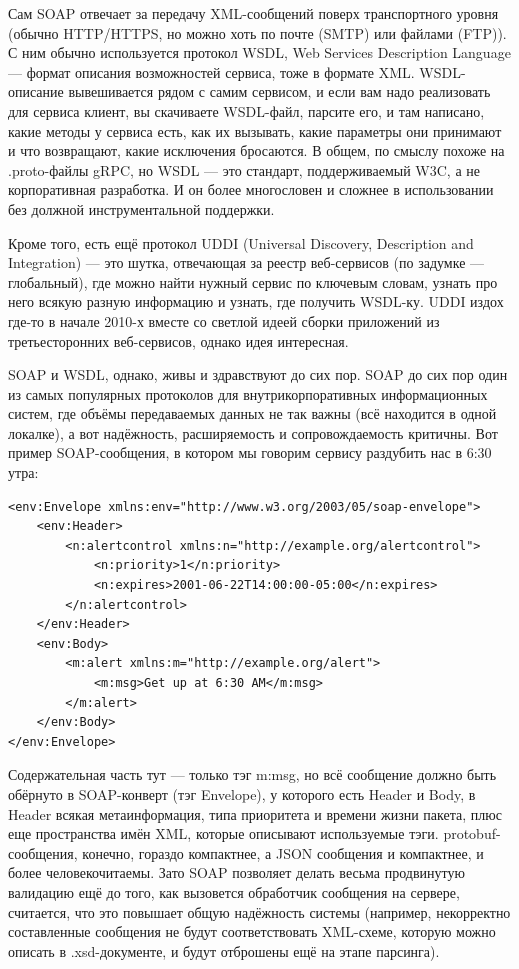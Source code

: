 \documentclass[a5paper]{article}
\begin{document}
Сам SOAP отвечает за передачу XML-сообщений поверх транспортного уровня (обычно HTTP/HTTPS, но можно хоть по почте (SMTP) или файлами (FTP)). С ним обычно используется протокол WSDL, Web Services Description Language --- формат описания возможностей сервиса, тоже в формате XML. WSDL-описание вывешивается рядом с самим сервисом, и если вам надо реализовать для сервиса клиент, вы скачиваете WSDL-файл, парсите его, и там написано, какие методы у сервиса есть, как их вызывать, какие параметры они принимают и что возвращают, какие исключения бросаются. В общем, по смыслу похоже на .proto-файлы gRPC, но WSDL --- это стандарт, поддерживаемый W3C, а не корпоративная разработка. И он более многословен и сложнее в использовании без должной инструментальной поддержки.

Кроме того, есть ещё протокол UDDI (Universal Discovery, Description and Integration) --- это шутка, отвечающая за реестр веб-сервисов (по задумке --- глобальный), где можно найти нужный сервис по ключевым словам, узнать про него всякую разную информацию и узнать, где получить WSDL-ку. UDDI издох где-то в начале 2010-х вместе со светлой идеей сборки приложений из третьесторонних веб-сервисов, однако идея интересная.

SOAP и WSDL, однако, живы и здравствуют до сих пор. SOAP до сих пор один из самых популярных протоколов для внутрикорпоративных информационных систем, где объёмы передаваемых данных не так важны (всё находится в одной локалке), а вот надёжность, расширяемость и сопровождаемость критичны. Вот пример SOAP-сообщения, в котором мы говорим сервису раздубить нас в 6:30 утра:

\begin{verbatim}
<env:Envelope xmlns:env="http://www.w3.org/2003/05/soap-envelope">
    <env:Header>
        <n:alertcontrol xmlns:n="http://example.org/alertcontrol">
            <n:priority>1</n:priority>
            <n:expires>2001-06-22T14:00:00-05:00</n:expires>
        </n:alertcontrol>
    </env:Header>
    <env:Body>
        <m:alert xmlns:m="http://example.org/alert">
            <m:msg>Get up at 6:30 AM</m:msg>
        </m:alert>
    </env:Body>
</env:Envelope>
\end{verbatim}

Содержательная часть тут --- только тэг m:msg, но всё сообщение должно быть обёрнуто в SOAP-конверт (тэг Envelope), у которого есть Header и Body, в Header всякая метаинформация, типа приоритета и времени жизни пакета, плюс еще пространства имён XML, которые описывают используемые тэги. protobuf-сообщения, конечно, гораздо компактнее, а JSON сообщения и компактнее, и более человекочитаемы. Зато SOAP позволяет делать весьма продвинутую валидацию ещё до того, как вызовется обработчик сообщения на сервере, считается, что это повышает общую надёжность системы (например, некорректно составленные сообщения не будут соответствовать XML-схеме, которую можно описать в .xsd-документе, и будут отброшены ещё на этапе парсинга).
\end{document}
